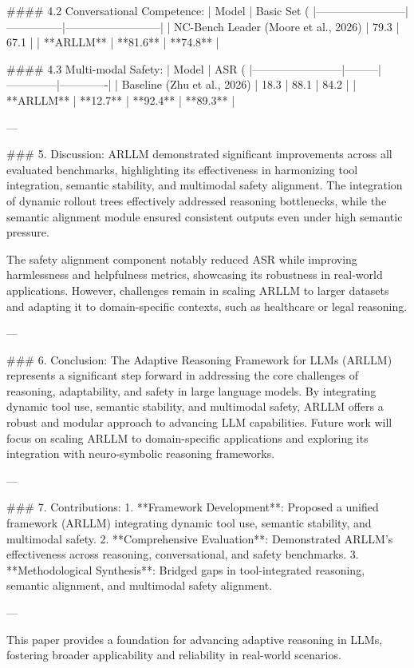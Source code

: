 #### 4.2 Conversational Competence:
| Model                  | Basic Set (%
|------------------------|---------------|--------------------------|
| NC-Bench Leader (Moore et al., 2026) | 79.3          | 67.1                   |
| **ARLLM**              | **81.6**      | **74.8**                |

#### 4.3 Multi-modal Safety:
| Model                  | ASR (%
|------------------------|---------|--------------|-------------|
| Baseline (Zhu et al., 2026) | 18.3    | 88.1         | 84.2        |
| **ARLLM**              | **12.7** | **92.4**     | **89.3**    |

---

### 5. Discussion:
ARLLM demonstrated significant improvements across all evaluated benchmarks, highlighting its effectiveness in harmonizing tool integration, semantic stability, and multimodal safety alignment. The integration of dynamic rollout trees effectively addressed reasoning bottlenecks, while the semantic alignment module ensured consistent outputs even under high semantic pressure.

The safety alignment component notably reduced ASR while improving harmlessness and helpfulness metrics, showcasing its robustness in real-world applications. However, challenges remain in scaling ARLLM to larger datasets and adapting it to domain-specific contexts, such as healthcare or legal reasoning.

---

### 6. Conclusion:
The Adaptive Reasoning Framework for LLMs (ARLLM) represents a significant step forward in addressing the core challenges of reasoning, adaptability, and safety in large language models. By integrating dynamic tool use, semantic stability, and multimodal safety, ARLLM offers a robust and modular approach to advancing LLM capabilities. Future work will focus on scaling ARLLM to domain-specific applications and exploring its integration with neuro-symbolic reasoning frameworks.

---

### 7. Contributions:
1. **Framework Development**: Proposed a unified framework (ARLLM) integrating dynamic tool use, semantic stability, and multimodal safety.
2. **Comprehensive Evaluation**: Demonstrated ARLLM's effectiveness across reasoning, conversational, and safety benchmarks.
3. **Methodological Synthesis**: Bridged gaps in tool-integrated reasoning, semantic alignment, and multimodal safety alignment.

--- 

This paper provides a foundation for advancing adaptive reasoning in LLMs, fostering broader applicability and reliability in real-world scenarios.
